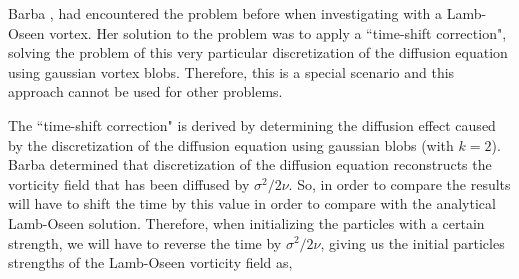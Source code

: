 Barba \cite{Barba2004c}, had encountered the problem before when investigating with a Lamb-Oseen vortex. Her solution to the problem was to apply a ``time-shift correction", solving the problem of this very particular discretization of the diffusion equation using gaussian vortex blobs. Therefore, this is a special scenario and this approach cannot be used for other problems.


The ``time-shift correction" is derived by determining the diffusion effect caused by the discretization of the diffusion equation using gaussian blobs (with $k=2$). Barba determined that discretization of the diffusion equation reconstructs the vorticity field that has been diffused by $\sigma^2/2\nu$. So, in order to compare the results will have to shift the time by this value in order to compare with the analytical Lamb-Oseen solution. Therefore, when initializing the particles with a certain strength, we will have to reverse the time by $\sigma^2/2\nu$, giving us the initial particles strengths of the Lamb-Oseen vorticity field as,

